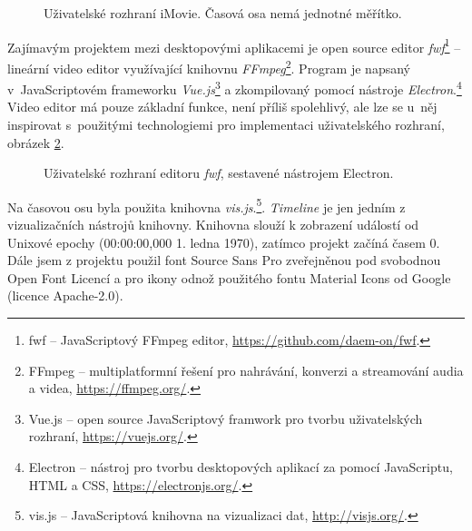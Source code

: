 \begin{figure}[h]
	\centering
	\caption{Uživatelské rozhraní iMovie. Časová osa nemá jednotné měřítko.}\label{img:imovie}
\end{figure}

Zajímavým projektem mezi desktopovými aplikacemi je open source editor \textit{fwf}\footnote{fwf -- JavaScriptový FFmpeg editor, \url{https://github.com/daem-on/fwf}.} -- lineární video editor využívající knihovnu \textit{FFmpeg}\footnote{FFmpeg -- multiplatformní řešení pro nahrávání, konverzi a streamování audia a videa, \url{https://ffmpeg.org/}.}. Program je napsaný v~JavaScriptovém frameworku \textit{Vue.js}\footnote{Vue.js -- open source JavaScriptový framwork pro tvorbu uživatelských rozhraní, \url{https://vuejs.org/}.} a zkompilovaný pomocí nástroje \textit{Electron}.\footnote{Electron -- nástroj pro tvorbu desktopových aplikací za pomocí JavaScriptu, HTML a CSS, \url{https://electronjs.org/}.} Video editor má pouze základní funkce, není příliš spolehlivý, ale lze se u~něj inspirovat s~použitými technologiemi pro implementaci uživatelského rozhraní, obrázek \ref{img:fwf}.
\begin{figure}[h]
	\centering
	\caption{Uživatelské rozhraní editoru \textit{fwf}, sestavené nástrojem Electron.}\label{img:fwf}
\end{figure}
Na časovou osu byla použita knihovna \textit{vis.js}.\footnote{vis.js -- JavaScriptová knihovna na vizualizaci dat, \url{http://visjs.org/}.}. \textit{Timeline} je jen jedním z vizualizačních nástrojů knihovny. Knihovna slouží k zobrazení událostí od Unixové epochy (00:00:00,000 1. ledna 1970), zatímco projekt začíná časem 0. Dále jsem z projektu použil font Source Sans Pro zveřejněnou pod svobodnou Open Font Licencí a pro ikony odnož použitého fontu Material Icons od Google (licence Apache-2.0).

